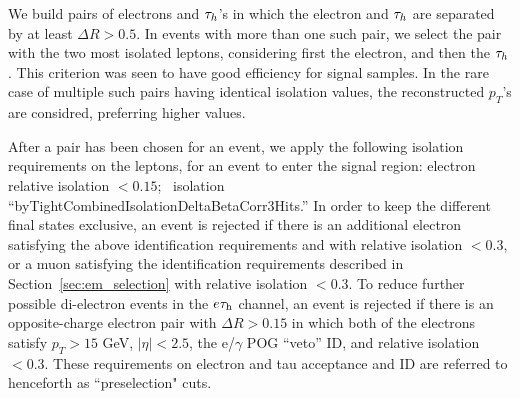 We build pairs of electrons and $\tau_h$'s in which the electron and
$\tau_h$ are separated by at least $\Delta R > 0.5$.  In events with
more than one such pair, we select the pair with the two most isolated
leptons, considering first the electron, and then the $\tau_h$.  This
criterion was seen to have good efficiency for signal samples.  In the
rare case of multiple such pairs having identical isolation values,
the reconstructed $p_T$'s are considred, preferring higher values.


After a pair has been chosen for an event, we apply the following
isolation requirements on the leptons, for an event to enter the
signal region: electron relative isolation $<0.15$; \tauh ~isolation
``byTightCombinedIsolationDeltaBetaCorr3Hits.''  In order to keep the
different final states exclusive, an event is rejected if there is an
additional electron satisfying the above identification requirements
and with relative isolation $<0.3$, or a muon satisfying the
identification requirements described in
Section~\ref{sec:em_selection} with relative isolation $<0.3$.  To
reduce further possible di-electron events in the $e\tau_{\textrm{h}}$ channel, an
event is rejected if there is an opposite-charge electron pair with
$\Delta R > 0.15$ in which both of the electrons satisfy $p_T >
15$ GeV, $\vert \eta \vert < 2.5$, the e/$\gamma$ POG ``veto'' ID,
and relative isolation $<0.3$. These requirements on electron and tau acceptance and ID are referred to henceforth as ``preselection" cuts.

